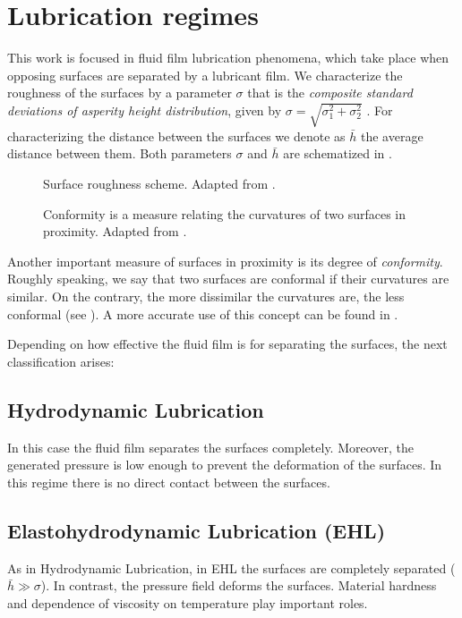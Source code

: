 \section{Lubrication regimes}This work is focused in fluid film lubrication phenomena, which take place when opposing surfaces are separated by a lubricant film. We characterize the roughness of the surfaces by a parameter $\sigma$ that is the \emph{composite standard deviations of asperity height distribution}, given by $\sigma=\sqrt{\sigma_1^2+\sigma_2^2}$ \cite{panayi08}. For characterizing the distance between the surfaces we denote as $\bar{h}$ the average distance between them. Both parameters $\sigma$ and $\bar{h}$ are schematized in .
 \begin{figure}[ht!]
 \centering 
 \def\svgwidth{0.8\textwidth}\small{
}\caption[Surface roughness scheme]{Surface roughness scheme. Adapted from \cite{panayi08}.}\label{fig:surfaces_roughness}
\end{figure}
 \begin{figure}[ht!]
 \centering 
 \def\svgwidth{0.9\textwidth}\small{
}
\caption[Conformity of the circular-shaped slider bearing]{Conformity is a measure relating the curvatures of two surfaces in proximity. Adapted from \cite{checo2014a}.}\label{fig:conformity}
\end{figure}

Another important measure of surfaces in proximity is its degree of \emph{conformity}. Roughly speaking, we say that two surfaces are conformal if their curvatures are similar. On the contrary, the more dissimilar the curvatures are, the less conformal (see ). A more accurate use of this concept can be found in .

Depending on how effective the fluid film is for separating the surfaces, the next classification arises:
\subsection{Hydrodynamic Lubrication}In this case the fluid film separates the surfaces completely. Moreover, the generated pressure is low enough to prevent the deformation of the surfaces. In this regime there is no direct contact between the surfaces. 
\subsection[Elastohydrodynamic Lubrication]{Elastohydrodynamic Lubrication (EHL)} As in Hydrodynamic Lubrication, in EHL the surfaces are  completely separated ($\bar{h}\gg \sigma$). In contrast, the pressure field deforms the surfaces. Material hardness and dependence of viscosity on temperature play important roles.
